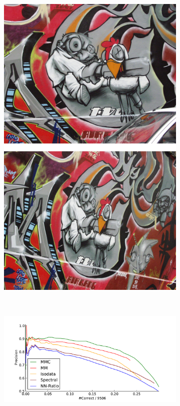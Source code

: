 \begin{figure}[t]
	\begin{subfigure}[c]{0.2\textwidth}
		\centering
		\includegraphics[width=\textwidth]{images/graf}
	\end{subfigure}%
	~ %
	\begin{subfigure}[c]{0.8\textwidth}
	\centering
	\includegraphics[width=\columnwidth]{images/result_graf}

\end{subfigure}
\end{figure}
